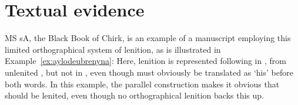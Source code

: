 \section{Textual evidence}
\label{sec:two-exampl-mowm}
MS \gls{sA}, the Black Book of Chirk,  is an example of a manuscript employing this limited orthographical system of lenition, as is illustrated in Example~\ref{ex:aylodeubrenyna}: 
Here, lenition is represented following   in , from unlenited , but not in , even though  must obviously be translated as `his' before both words. In this example, the parallel construction makes it obvious that  should be lenited, even though  no orthographical lenition backs this up.


